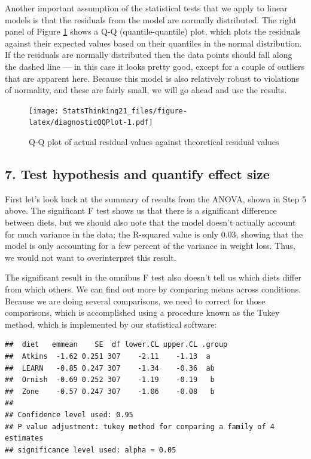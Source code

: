 \documentclass[12pt,]{book}
\theoremstyle{definition}
\theoremstyle{definition}
\theoremstyle{definition}
\theoremstyle{remark}
\begin{document}
Another important assumption of the statistical tests that we apply to linear models is that the residuals from the model are normally distributed. The right panel of Figure \ref{fig:diagnosticQQPlot} shows a Q-Q (quantile-quantile) plot, which plots the residuals against their expected values based on their quantiles in the normal distribution. If the residuals are normally distributed then the data points should fall along the dashed line --- in this case it looks pretty good, except for a couple of outliers that are apparent here. Because this model is also relatively robust to violations of normality, and these are fairly small, we will go ahead and use the results.

\begin{figure}
\centering
\texttt{[image: StatsThinking21\_files/figure-latex/diagnosticQQPlot-1.pdf]}
\caption{\label{fig:diagnosticQQPlot}Q-Q plot of actual residual values against theoretical residual values}
\end{figure}

\hypertarget{test-hypothesis-and-quantify-effect-size}{%
\subsection{7. Test hypothesis and quantify effect size}\label{test-hypothesis-and-quantify-effect-size}}

First let's look back at the summary of results from the ANOVA, shown in Step 5 above. The significant F test shows us that there is a significant difference between diets, but we should also note that the model doesn't actually account for much variance in the data; the R-squared value is only 0.03, showing that the model is only accounting for a few percent of the variance in weight loss. Thus, we would not want to overinterpret this result.

The significant result in the omnibus F test also doesn't tell us which diets differ from which others. We can find out more by comparing means across conditions. Because we are doing several comparisons, we need to correct for those comparisons, which is accomplished using a procedure known as the Tukey method, which is implemented by our statistical software:

\begin{verbatim}
##  diet   emmean    SE  df lower.CL upper.CL .group
##  Atkins  -1.62 0.251 307    -2.11    -1.13  a    
##  LEARN   -0.85 0.247 307    -1.34    -0.36  ab   
##  Ornish  -0.69 0.252 307    -1.19    -0.19   b   
##  Zone    -0.57 0.247 307    -1.06    -0.08   b   
## 
## Confidence level used: 0.95 
## P value adjustment: tukey method for comparing a family of 4 estimates 
## significance level used: alpha = 0.05
\end{verbatim}
\end{document}
